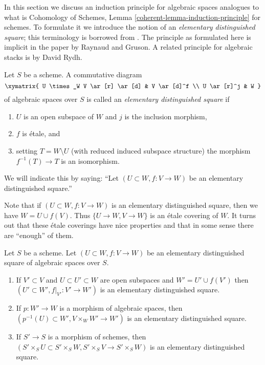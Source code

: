 \noindent
In this section we discuss an induction principle for algebraic spaces
analogues to what is
Cohomology of Schemes, Lemma \ref{coherent-lemma-induction-principle}
for schemes. To formulate it we introduce the notion of an
{\it elementary distinguished square}; this terminology is borrowed
from \cite{MV}.
The principle as formulated here is implicit in the paper \cite{GruRay}
by Raynaud and Gruson.
A related principle for algebraic stacks is
\cite[Theorem D]{rydh_etale_devissage} by David Rydh.

\begin{definition}
\label{definition-elementary-distinguished-square}
Let $S$ be a scheme. A commutative diagram
$$
\xymatrix{
U \times_W V \ar[r] \ar[d] & V \ar[d]^f \\
U \ar[r]^j & W
}
$$
of algebraic spaces over $S$ is called an {\it elementary distinguished square}
if
\begin{enumerate}
\item $U$ is an open subspace of $W$ and $j$ is the inclusion morphism,
\item $f$ is \'etale, and
\item setting $T = W \setminus U$ (with reduced induced
subspace structure) the morphism $f^{-1}(T) \to T$ is an isomorphism.
\end{enumerate}
We will indicate this by saying: ``Let $(U \subset W, f : V \to W)$
be an elementary distinguished square.''
\end{definition}

\noindent
Note that if $(U \subset W, f : V \to W)$ is an elementary distinguished
square, then we have $W = U \cup f(V)$. Thus $\{U \to W, V \to W\}$ is
an \'etale covering of $W$. It turns out that these \'etale coverings
have nice properties and that in some sense
there are ``enough'' of them.

\begin{lemma}
\label{lemma-make-more-elementary-distinguished-squares}
Let $S$ be a scheme. Let $(U \subset W, f : V \to W)$ be an elementary
distinguished square of algebraic spaces over $S$.
\begin{enumerate}
\item If $V' \subset V$ and
$U \subset U' \subset W$ are open subspaces and $W' = U' \cup f(V')$
then $(U' \subset W', f|_{V'} : V' \to W')$ is an elementary distinguished
square.
\item If $p : W' \to W$ is a morphism of algebraic spaces, then
$(p^{-1}(U) \subset W', V \times_W W' \to W')$ is an elementary distinguished
square.
\item If $S' \to S$ is a morphism of schemes, then
$(S' \times_S U \subset S' \times_S W, S' \times_S V \to S' \times_S W)$
is an elementary distinguished square.
\end{enumerate}
\end{lemma}

